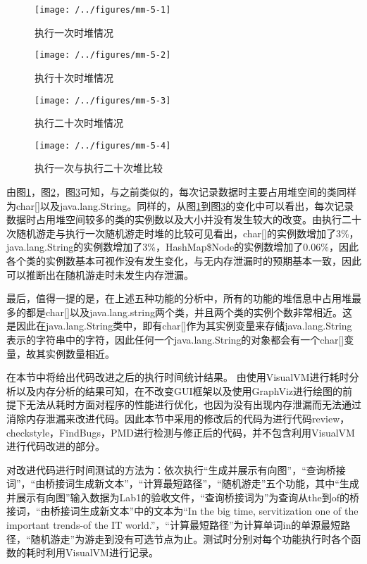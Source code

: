 \begin{figure}
\centering
\texttt{[image: /../figures/mm-5-1]}
\caption{执行一次时堆情况}
\label{fig:mm-5-1}
\end{figure}

\begin{figure}
\centering
\texttt{[image: /../figures/mm-5-2]}
\caption{执行十次时堆情况}
\label{fig:mm-5-2}
\end{figure}

\begin{figure}
\centering
\texttt{[image: /../figures/mm-5-3]}
\caption{执行二十次时堆情况}
\label{fig:mm-5-3}
\end{figure}

\begin{figure}
\centering
\texttt{[image: /../figures/mm-5-4]}
\caption{执行一次与执行二十次堆比较}
\label{fig:mm-5-4}
\end{figure}

由图\ref{fig:mm-5-1}，图\ref{fig:mm-5-2}，图\ref{fig:mm-5-3}可知，与之前类似的，每次记录数据时主要占用堆空间的类同样为char[]以及java.lang.String。同样的，从图\ref{fig:mm-5-1}到图\ref{fig:mm-5-3}的变化中可以看出，每次记录数据时占用堆空间较多的类的实例数以及大小并没有发生较大的改变。由执行二十次随机游走与执行一次随机游走时堆的比较可见看出，char[]的实例数增加了3\%，java.lang.String的实例数增加了3\%，HashMap\$Node的实例数增加了0.06\%，因此各个类的实例数基本可视作没有发生变化，与无内存泄漏时的预期基本一致，因此可以推断出在随机游走时未发生内存泄漏。

最后，值得一提的是，在上述五种功能的分析中，所有的功能的堆信息中占用堆最多的都是char[]以及java.lang.string两个类，并且两个类的实例个数非常相近。这是因此在java.lang.String类中，即有char[]作为其实例变量来存储java.lang.String表示的字符串中的字符，因此任何一个java.lang.String的对象都会有一个char[]变量，故其实例数量相近。

在本节中将给出代码改进之后的执行时间统计结果。
由使用VisualVM进行耗时分析以及内存分析的结果可知，在不改变GUI框架以及使用GraphViz进行绘图的前提下无法从耗时方面对程序的性能进行优化，也因为没有出现内存泄漏而无法通过消除内存泄漏来改进代码。因此本节中采用的修改后的代码为进行代码review，checkstyle，FindBugs，PMD进行检测与修正后的代码，并不包含利用VisualVM进行代码改进的部分。

对改进代码进行时间测试的方法为：依次执行“生成并展示有向图”，“查询桥接词”，“由桥接词生成新文本”，“计算最短路径”，“随机游走”五个功能，其中“生成并展示有向图”输入数据为Lab1的验收文件，“查询桥接词为”为查询从the到of的桥接词，“由桥接词生成新文本”中的文本为“In the big time, servitization one of the important trends-of the IT world.”，“计算最短路径”为计算单词in的单源最短路径，“随机游走”为游走到没有可选节点为止。测试时分别对每个功能执行时各个函数的耗时利用VisualVM进行记录。

